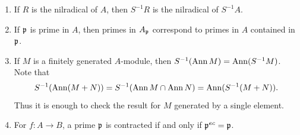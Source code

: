 \documentclass[11pt,a4paper]{article}
\begin{document}
\setcounter{theorem}{7}\begin{corollary}
\begin{enumerate}[label=(\roman*)]
\setcounter{enumi}{0}\item If $R$ is the nilradical of $A$, then $S^{-1}R$ is the nilradical of $S^{-1}A$.
\setcounter{enumi}{1}\item If $\mathfrak p$ is prime in $A$, then primes in $A_{\mathfrak p}$ correspond to primes in $A$ contained in $\mathfrak p$.
\setcounter{enumi}{2}\item If $M$ is a finitely generated $A$-module, then $S^{-1}(\operatorname{Ann} M)=\operatorname{Ann}(S^{-1}M)$. Note that
\[
S^{-1}(\operatorname{Ann}(M+N))=S^{-1}(\operatorname{Ann} M\cap\operatorname{Ann} N)
=\operatorname{Ann}(S^{-1}(M+N)).
\]
Thus it is enough to check the result for $M$ generated by a single element.
\setcounter{enumi}{3}\item For $f:A\to B$, a prime $\mathfrak p$ is contracted if and only if $\mathfrak p^{ec}=\mathfrak p$.
\end{enumerate}
\end{corollary}
\end{document}
